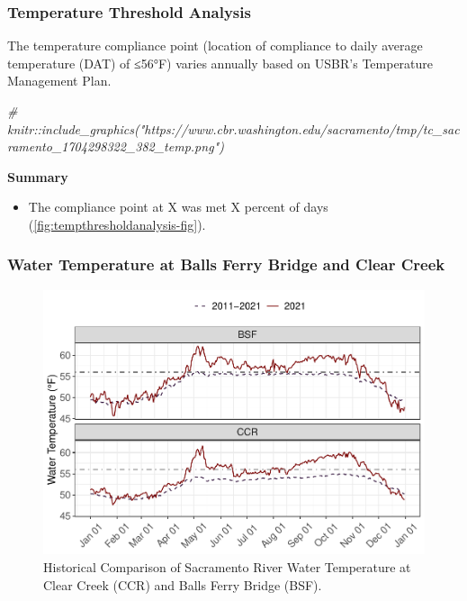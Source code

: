 \documentclass[
]{book}
\newenvironment{Shaded}{\begin{snugshade}}{\end{snugshade}}
\newcommand{\CommentTok}[1]{\textcolor[rgb]{0.56,0.35,0.01}{\textit{#1}}}
\providecommand{\tightlist}{%
  \setlength{\itemsep}{0pt}\setlength{\parskip}{0pt}}
\theoremstyle{definition}
\theoremstyle{definition}
\theoremstyle{definition}
\theoremstyle{definition}
\theoremstyle{remark}
\begin{document}
\hypertarget{temp-thresholds}{%
\subsubsection{Temperature Threshold Analysis}\label{temp-thresholds}}

The temperature compliance point (location of compliance to daily average temperature (DAT) of ≤56°F) varies annually based on USBR's Temperature Management Plan.

\begin{Shaded}
\begin{Highlighting}[]
\CommentTok{\# knitr::include\_graphics("https://www.cbr.washington.edu/sacramento/tmp/tc\_sacramento\_1704298322\_382\_temp.png")}
\end{Highlighting}
\end{Shaded}

\textbf{Summary}

\begin{itemize}
\tightlist
\item
  The compliance point at X was met X percent of days (\ref{fig:tempthresholdanalysis-fig}).
\end{itemize}

\hypertarget{water-temperature-at-balls-ferry-bridge-and-clear-creek}{%
\subsubsection{Water Temperature at Balls Ferry Bridge and Clear Creek}\label{water-temperature-at-balls-ferry-bridge-and-clear-creek}}

\begin{figure}
\centering
\includegraphics{_main_files/figure-latex/historicalwtemp-fig-1.pdf}
\caption{\label{fig:historicalwtemp-fig}Historical Comparison of Sacramento River Water Temperature at Clear Creek (CCR) and Balls Ferry Bridge (BSF).}
\end{figure}
\end{document}
